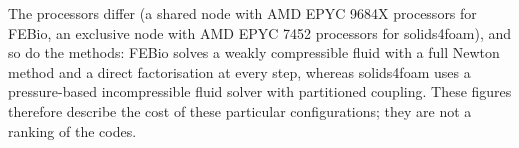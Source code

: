 The processors differ (a shared node with AMD EPYC 9684X processors for FEBio, an exclusive node with AMD EPYC 7452 processors for solids4foam), and so do the methods: FEBio solves a weakly compressible fluid with a full Newton method and a direct factorisation at every step, whereas solids4foam uses a pressure-based incompressible fluid solver with partitioned coupling.
These figures therefore describe the cost of these particular configurations; they are not a ranking of the codes.
